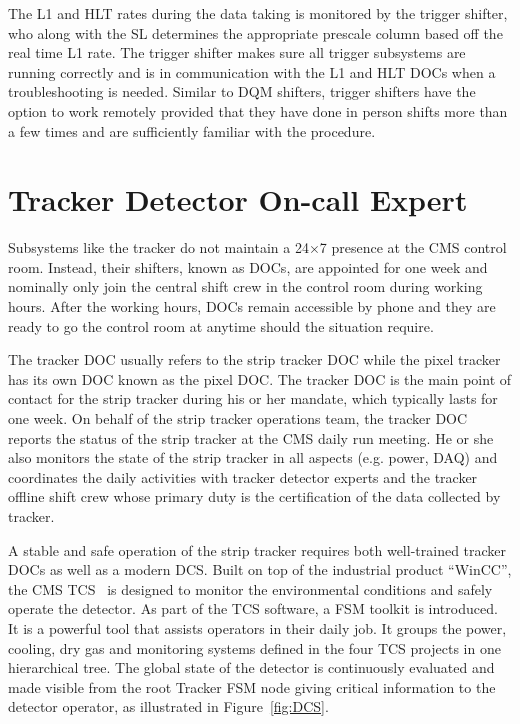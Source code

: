 The \ac{L1} and \ac{HLT} rates during the data taking is monitored by the trigger shifter, who along with the \ac{SL} determines the appropriate prescale column based off the real time \ac{L1} rate. The trigger shifter makes sure all trigger subsystems are running correctly and is in communication with the \ac{L1} and \ac{HLT} \acp{DOC} when a troubleshooting is needed. Similar to \ac{DQM} shifters, trigger shifters have the option to work remotely provided that they have done in person shifts more than a few times and are sufficiently familiar with the procedure. 

\section{Tracker Detector On-call Expert}
\label{sec:DOC}

Subsystems like the tracker do not maintain a 24$\times$7 presence at the \ac{CMS} control room. Instead, their shifters, known as \acp{DOC}, are appointed for one week and nominally only join the central shift crew in the control room during working hours. After the working hours, \acp{DOC} remain accessible by phone and they are ready to go the control room at anytime should the situation require. 

The tracker \ac{DOC} usually refers to the strip tracker \ac{DOC} while the pixel tracker has its own \ac{DOC} known as the pixel \ac{DOC}. The tracker \ac{DOC} is the main point of contact for the strip tracker during his or her mandate, which typically lasts for one week. On behalf of the strip tracker operations team, the tracker \ac{DOC} reports the status of the strip tracker at the \ac{CMS} daily run meeting. He or she also monitors the state of the strip tracker in all aspects (e.g. power, \ac{DAQ}) and coordinates the daily activities with tracker detector experts and the tracker offline shift crew whose primary duty is the certification of the data collected by tracker. 

A stable and safe operation of the strip tracker requires both well-trained tracker \acp{DOC} as well as a modern \ac{DCS}. Built on top of the industrial product “WinCC”, the \ac{CMS} \ac{TCS}~\cite{Shah:2009zz,Karimeh:2020tzx} is designed to monitor the environmental conditions and safely operate the detector. As part of the \ac{TCS} software, a \ac{FSM} toolkit is introduced. It is a powerful tool that assists operators in their daily job. It groups the power, cooling, dry gas and monitoring systems defined in the four \ac{TCS} projects in one hierarchical tree. The global state of the detector is continuously evaluated and made visible from the root Tracker FSM node giving critical information to the detector operator, as illustrated in Figure~\ref{fig:DCS}.

